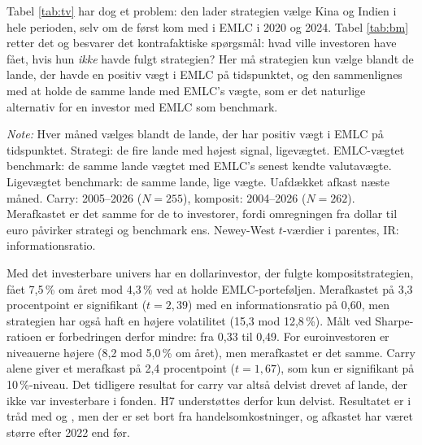 \documentclass[11pt,a4paper]{article}
\begin{document}
Tabel \ref{tab:tv} har dog et problem: den lader strategien vælge Kina og Indien i hele perioden, selv om de først kom med i EMLC i 2020 og 2024. Tabel \ref{tab:bm} retter det og besvarer det kontrafaktiske spørgsmål: hvad ville investoren have fået, hvis hun \emph{ikke} havde fulgt strategien? Her må strategien kun vælge blandt de lande, der havde en positiv vægt i EMLC på tidspunktet, og den sammenlignes med at holde de samme lande med EMLC's vægte, som er det naturlige alternativ for en investor med EMLC som benchmark.

\begin{table}[htbp]
\centering
\begin{threeparttable}
\caption{Strategi mod kontrafaktisk benchmark: investerbare lande}
\label{tab:bm}
\small
\setlength{\tabcolsep}{5pt}

\begin{tablenotes}\footnotesize
\item \emph{Note:} Hver måned vælges blandt de lande, der har positiv vægt i EMLC på tidspunktet. Strategi: de fire lande med højest signal, ligevægtet. EMLC-vægtet benchmark: de samme lande vægtet med EMLC's senest kendte valutavægte. Ligevægtet benchmark: de samme lande, lige vægte. Uafdækket afkast næste måned. Carry: 2005--2026 ($N=255$), komposit: 2004--2026 ($N=262$). Merafkastet er det samme for de to investorer, fordi omregningen fra dollar til euro påvirker strategi og benchmark ens. Newey-West $t$-værdier i parentes, IR: informationsratio.
\end{tablenotes}
\end{threeparttable}
\end{table}

Med det investerbare univers har en dollarinvestor, der fulgte kompositstrategien, fået 7,5\,\% om året mod 4,3\,\% ved at holde EMLC-porteføljen. Merafkastet på 3,3 procentpoint er signifikant ($t=2{,}39$) med en informationsratio på 0,60, men strategien har også haft en højere volatilitet (15,3 mod 12,8\,\%). Målt ved Sharpe-ratioen er forbedringen derfor mindre: fra 0,33 til 0,49. For euroinvestoren er niveauerne højere (8,2 mod 5,0\,\% om året), men merafkastet er det samme. Carry alene giver et merafkast på 2,4 procentpoint ($t=1{,}67$), som kun er signifikant på 10\,\%-niveau. Det tidligere resultat for carry var altså delvist drevet af lande, der ikke var investerbare i fonden. H7 understøttes derfor kun delvist. Resultatet er i tråd med \citet{lustig2011} og \citet{asness2013}, men der er set bort fra handelsomkostninger, og afkastet har været større efter 2022 end før.
\end{document}
